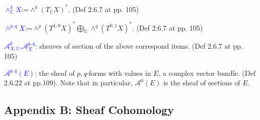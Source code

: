 \documentclass{book}
\numberwithin{equation}{subsection} %
\theoremstyle{definition}
\begin{document}
    \textcolor{blue}{$\wedge^k_{\mathbb{C}}X$}:=$\wedge^k(T_{\mathbb{C}}X)^*$. (Def 2.6.7 at pp. 105)
    
    \textcolor{blue}{$\wedge^{p,q}X$}:=$\wedge^p(T^{1,0}X)^*
                        \bigoplus_{\mathbb{C}}\wedge^q(T^{0,1}X)^*$. (Def 2.6.7 at pp. 105)

    \textcolor{blue}{$\mathcal{A}^k_{X,\mathbb{C}}$,$\mathcal{A}^{p,q}_X$}: sheaves of section of the above correspond items. (Def 2.6.7 at pp. 105)
    
    \textcolor{blue}{$\mathcal{A}^{p,q}(E)$}: the sheaf of $p,q$-forms with values in $E$, a complex vector bundle. (Def 2.6.22 at pp.109). Note that in particular, $\mathcal{A}^0(E)$ is the sheaf of sections of $E$.

	\subsection{Appendix B: Sheaf Cohomology}
	
\end{document}
